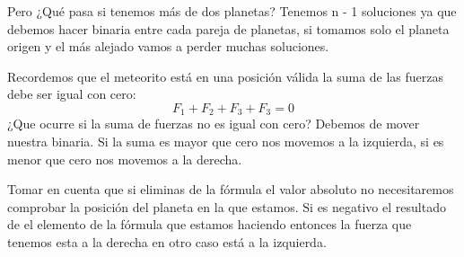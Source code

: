 Pero ¿Qué pasa si tenemos más de dos planetas? Tenemos n - 1 soluciones ya que debemos hacer binaria entre cada pareja de planetas, si tomamos solo el planeta origen y el más alejado vamos a perder muchas soluciones.
\begin{figure}[H]
    \begin{center}
    \end{center}
\end{figure}
Recordemos que el meteorito está en una posición válida la suma de las fuerzas debe ser igual con cero:
\[
    F_{1} + F_{2} + F_{3} + F_{3} = 0 
\]
¿Que ocurre si la suma de fuerzas no es igual con cero? Debemos de mover nuestra binaria. Si la suma es mayor que cero nos movemos a la izquierda, si es menor que cero nos movemos a la derecha.

Tomar en cuenta que si eliminas de la fórmula el valor absoluto no necesitaremos comprobar la posición del planeta en la que estamos. Si es negativo el resultado de el elemento de la fórmula que estamos haciendo entonces la fuerza que tenemos esta a la derecha en otro caso está a la izquierda.

